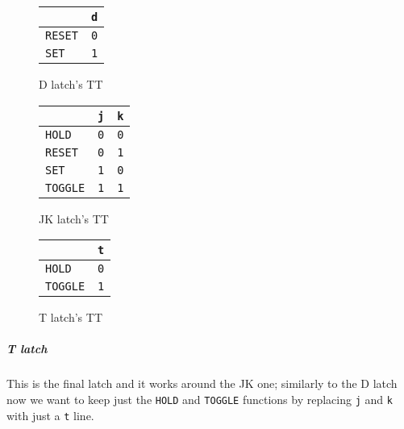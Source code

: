 \documentclass{scrartcl}
\newcommand{\zero}{\texttt{0}}
\newcommand{\one}{\texttt{1}}
\begin{document}
    \begin{figure}[!htb]
        \centering
        \begin{tabular}{| l | c |}
            \hline
            & \texttt{d}\\\hline
            \texttt{RESET} & \zero\\
            \texttt{SET} & \one\\
            \hline
        \end{tabular}
        \caption{D latch's TT}
        \endminipage\hfill
        \centering
        \begin{tabular}{| l | c | c |}
            \hline
            & \texttt{j} & \texttt{k} \\\hline
            \texttt{HOLD} & \zero & \zero\\
            \texttt{RESET} & \zero & \one\\
            \texttt{SET} & \one & \zero\\
            \texttt{TOGGLE} & \one & \one\\\hline
        \end{tabular}
        \caption{JK latch's TT}
        \endminipage\hfill
        \centering
        \begin{tabular}{| l | c |}
            \hline
            & \texttt{t}\\\hline
            \texttt{HOLD} & \zero\\
            \texttt{TOGGLE} & \one\\
            \hline
        \end{tabular}
        \caption{T latch's TT}
        \endminipage
        \end{figure}
    \subparagraph{T latch} This is the final latch and it works around the JK one; similarly to the D latch now we want to keep just the \texttt{HOLD} and \texttt{TOGGLE} functions by replacing \texttt{j} and \texttt{k} with just a \texttt{t} line.
\end{document}
